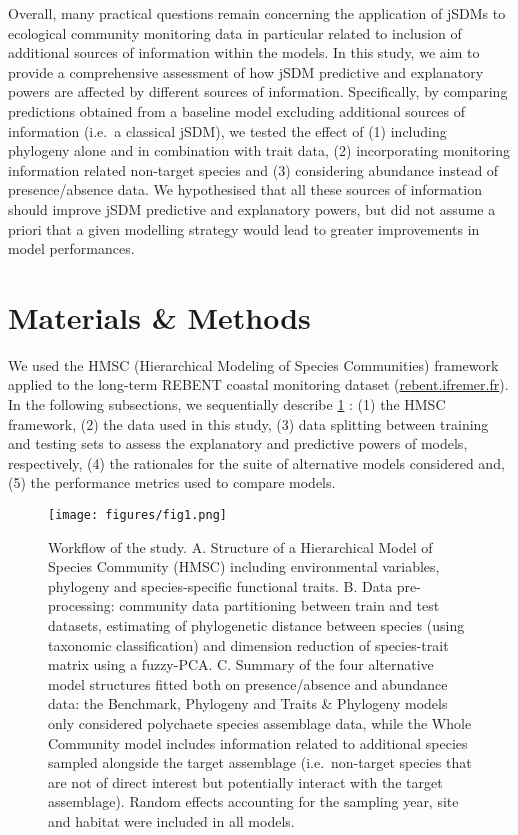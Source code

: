 \documentclass[9pt,biorxiv,doublespacing,lineno]{lapreprint}
\begin{document}
Overall, many practical questions remain concerning the application of
jSDMs to ecological community monitoring data in particular related to
inclusion of additional sources of information within the models. In
this study, we aim to provide a comprehensive assessment of how jSDM
predictive and explanatory powers are affected by different sources of
information. Specifically, by comparing predictions obtained from a
baseline model excluding additional sources of information (i.e.~a
classical jSDM), we tested the effect of (1) including phylogeny alone
and in combination with trait data, (2) incorporating monitoring
information related non-target species and (3) considering abundance
instead of presence/absence data. We hypothesised that all these sources
of information should improve jSDM predictive and explanatory powers,
but did not assume a priori that a given modelling strategy would lead
to greater improvements in model performances.

\hypertarget{materials-methods}{%
\section{Materials \& Methods}\label{materials-methods}}

We used the HMSC (Hierarchical Modeling of Species Communities)
framework applied to the long-term REBENT coastal monitoring dataset
(\href{https://rebent.ifremer.fr}{rebent.ifremer.fr}). In the following
subsections, we sequentially describe \cref{fig:workflow} : (1) the HMSC
framework, (2) the data used in this study, (3) data splitting between
training and testing sets to assess the explanatory and predictive
powers of models, respectively, (4) the rationales for the suite of
alternative models considered and, (5) the performance metrics used to
compare models.

\begin{figure}
\hypertarget{fig:workflow}{%
\centering
\texttt{[image: figures/fig1.png]}
\caption{Workflow of the study. A. Structure of a Hierarchical Model of
Species Community (HMSC) including environmental variables, phylogeny
and species-specific functional traits. B. Data pre-processing:
community data partitioning between train and test datasets, estimating
of phylogenetic distance between species (using taxonomic
classification) and dimension reduction of species-trait matrix using a
fuzzy-PCA. C. Summary of the four alternative model structures fitted
both on presence/absence and abundance data: the Benchmark, Phylogeny
and Traits \& Phylogeny models only considered polychaete species
assemblage data, while the Whole Community model includes information
related to additional species sampled alongside the target assemblage
(i.e.~non-target species that are not of direct interest but potentially
interact with the target assemblage). Random effects accounting for the
sampling year, site and habitat were included in all
models.}\label{fig:workflow}
}
\end{figure}
\end{document}
